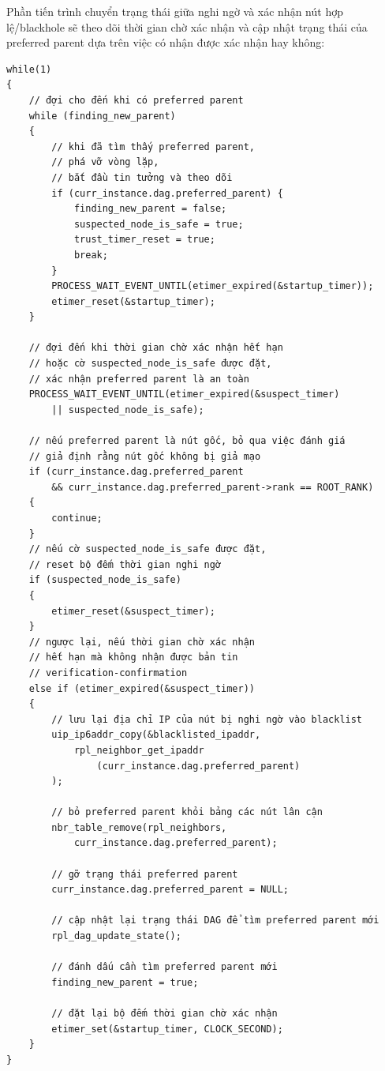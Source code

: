 Phần tiến trình chuyển trạng thái giữa nghi ngờ và xác nhận nút hợp lệ/blackhole sẽ theo dõi thời gian chờ xác nhận và cập nhật trạng thái của preferred parent dựa trên việc có nhận được xác nhận hay không:

\begin{verbatim}
while(1)
{
    // đợi cho đến khi có preferred parent
    while (finding_new_parent)
    {
        // khi đã tìm thấy preferred parent,
        // phá vỡ vòng lặp,
        // bắt đầu tin tưởng và theo dõi
        if (curr_instance.dag.preferred_parent) {
            finding_new_parent = false;
            suspected_node_is_safe = true;
            trust_timer_reset = true;
            break;
        }
        PROCESS_WAIT_EVENT_UNTIL(etimer_expired(&startup_timer));
        etimer_reset(&startup_timer);
    }

    // đợi đến khi thời gian chờ xác nhận hết hạn
    // hoặc cờ suspected_node_is_safe được đặt,
    // xác nhận preferred parent là an toàn
    PROCESS_WAIT_EVENT_UNTIL(etimer_expired(&suspect_timer)
        || suspected_node_is_safe);

    // nếu preferred parent là nút gốc, bỏ qua việc đánh giá
    // giả định rằng nút gốc không bị giả mạo
    if (curr_instance.dag.preferred_parent
        && curr_instance.dag.preferred_parent->rank == ROOT_RANK)
    {
        continue;
    }
    // nếu cờ suspected_node_is_safe được đặt,
    // reset bộ đếm thời gian nghi ngờ
    if (suspected_node_is_safe)
    {
        etimer_reset(&suspect_timer);
    }
    // ngược lại, nếu thời gian chờ xác nhận
    // hết hạn mà không nhận được bản tin
    // verification-confirmation
    else if (etimer_expired(&suspect_timer))
    {   
        // lưu lại địa chỉ IP của nút bị nghi ngờ vào blacklist        
        uip_ip6addr_copy(&blacklisted_ipaddr,
            rpl_neighbor_get_ipaddr
                (curr_instance.dag.preferred_parent)
        );

        // bỏ preferred parent khỏi bảng các nút lân cận
        nbr_table_remove(rpl_neighbors,
            curr_instance.dag.preferred_parent);

        // gỡ trạng thái preferred parent
        curr_instance.dag.preferred_parent = NULL;

        // cập nhật lại trạng thái DAG để tìm preferred parent mới
        rpl_dag_update_state();

        // đánh dấu cần tìm preferred parent mới
        finding_new_parent = true;

        // đặt lại bộ đếm thời gian chờ xác nhận
        etimer_set(&startup_timer, CLOCK_SECOND);
    }
}
\end{verbatim}

